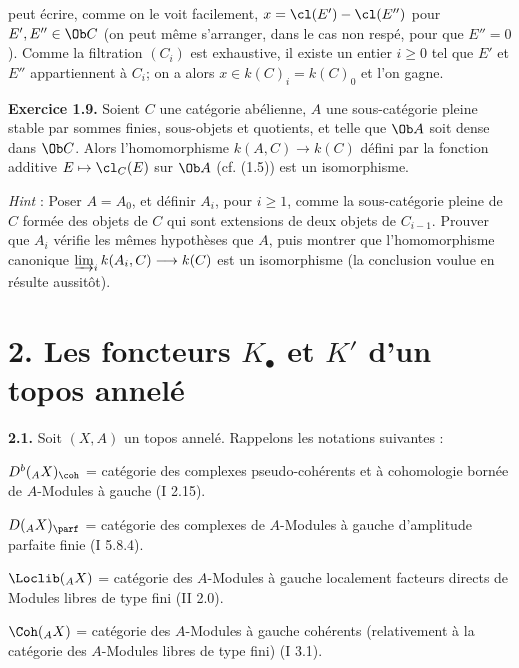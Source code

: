 peut écrire, comme on le voit facilement, \(x=\cl(E')-\cl(E'')\) pour \(E',E''\in\Ob C\) (on peut même s'arranger, dans le cas non respé, pour que \(E''=0\)). Comme la filtration \((C_i)\) est exhaustive, il existe un entier \(i\geq0\) tel que \(E'\) et \(E''\) appartiennent à \(C_i\); on a alors \(x\in k(C)_i=k(C)_0\) et l'on gagne.

\textbf{Exercice 1.9.} Soient \(C\) une catégorie abélienne, \(A\) une sous-catégorie pleine stable par sommes finies, sous-objets et quotients, et telle que \(\Ob A\) soit dense dans \(\Ob C\). Alors l'homomorphisme \(k(A,C)\longrightarrow k(C)\) défini par la fonction additive \(E\mapsto\cl_C(E)\) sur \(\Ob A\) (cf. (1.5)) est un isomorphisme.

\emph{Hint} : Poser \(A=A_0\), et définir \(A_i\), pour \(i\geq1\), comme la sous-catégorie pleine de \(C\) formée des objets de \(C\) qui sont extensions de deux objets de \(C_{i-1}\). Prouver que \(A_i\) vérifie les mêmes hypothèses que \(A\), puis montrer que l'homomorphisme canonique \(\varinjlim_i k(A_i,C)\longrightarrow k(C)\) est un isomorphisme (la conclusion voulue en résulte aussitôt).

\section*{2. Les foncteurs \(K_{\bullet}\) et \(K'\) d'un topos annelé}

\textbf{2.1.} Soit \((X,A)\) un topos annelé. Rappelons les notations suivantes :

\(D^b({}_A X)_{\coh}\) = catégorie des complexes pseudo-cohérents et à cohomologie bornée de \(A\)-Modules à gauche (I 2.15).

\(D({}_A X)_{\parf}\) = catégorie des complexes de \(A\)-Modules à gauche d'amplitude parfaite finie (I 5.8.4).

\(\Loclib({}_A X)\) = catégorie des \(A\)-Modules à gauche localement facteurs directs de Modules libres de type fini (II 2.0).

\(\Coh({}_A X)\) = catégorie des \(A\)-Modules à gauche cohérents (relativement à la catégorie des \(A\)-Modules libres de type fini) (I 3.1).

